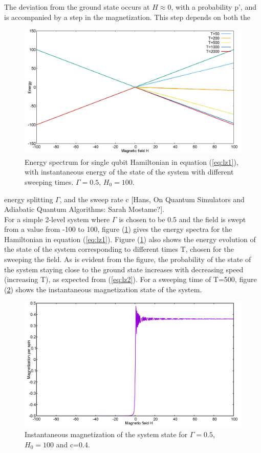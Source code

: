 \documentclass[../main.tex]{subfiles}
\begin{document}
The deviation from the ground state occurs at $H \approx 0$, with a probability p', and is accompanied by a step in the magnetization. This step depends on both the
\begin{figure}[H]
\centering 
\includegraphics[scale=0.3]{EnergySpec_1spin_H100.png}
\caption{Energy spectrum for single qubit Hamiltonian in equation (\ref{eq:lz1}), with instantaneous energy of the state of the system with different sweeping times. $\Gamma=0.5$, $H_0=100$.}
\label{fig:lz1}
\end{figure}
 energy splitting  $\Gamma$, and the sweep rate c [Hans, On Quantum Simulators and Adiabatic Quantum Algorithms: Sarah Mostame?].\\
For a simple 2-level system where $\Gamma$ is chosen to be 0.5 and the field is swept from a value from -100 to 100, figure (\ref{fig:lz1}) gives the energy spectra for the Hamiltonian in equation (\ref{eq:lz1}).
Figure (\ref{fig:lz1}) also shows the energy evolution of the state of the system corresponding to different times T, chosen for the sweeping the field. As is evident from the figure, the probability of the state of the system staying close to the ground state increases with decreasing speed (increasing T), as expected from (\ref{eq:lz2}). For a sweeping time of T=500, figure (\ref{fig:lz2}) shows the instantaneous magnetization state of the system.
\begin{figure}[H]
\centering 
\includegraphics[scale=0.3]{Magnetization_500.png}
\caption{Instantaneous magnetization of the system state for $\Gamma=0.5$, $H_0=100$ and c=0.4.}
\label{fig:lz2}
\end{figure}
\end{document}
